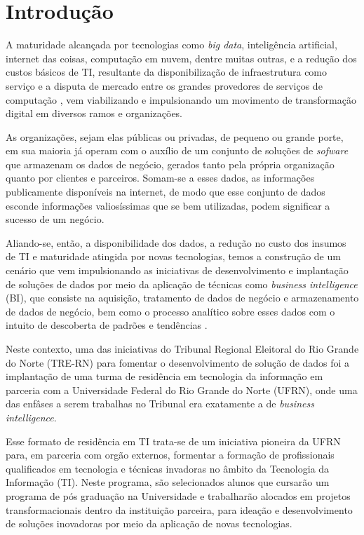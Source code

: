 
\section{Introdução}
A maturidade alcançada por tecnologias como \textit{big data}, inteligência artificial, internet das coisas, computação em nuvem, dentre muitas outras, e a redução dos custos básicos de TI, resultante da disponibilização de infraestrutura como serviço e a disputa de mercado entre os grandes provedores de serviços de computação \cite{infraPriceDrop}, vem viabilizando e impulsionando um movimento de transformação digital em diversos ramos e organizações.

As organizações, sejam elas públicas ou privadas, de pequeno ou grande porte, em sua maioria já operam com o auxílio de um conjunto de soluções de \textit{sofware} que armazenam os dados de negócio, gerados tanto pela própria organização quanto por clientes e parceiros. Somam-se a esses dados, as informações publicamente disponíveis na internet, de modo que esse conjunto de dados esconde informações valiosíssimas que se bem utilizadas, podem significar a sucesso de um negócio. 

Aliando-se, então, a disponibilidade dos dados, a redução no custo dos insumos de TI e maturidade atingida por novas tecnologias, temos a construção de um cenário que vem impulsionando as iniciativas de desenvolvimento e implantação de soluções de dados por meio da aplicação de técnicas como \textit{business intelligence} (BI), que consiste na aquisição, tratamento de dados de negócio e armazenamento de dados de negócio, bem como o processo analítico sobre esses dados com o intuito de descoberta de padrões e tendências \cite{BIDef}.

Neste contexto, uma das iniciativas do Tribunal Regional Eleitoral do Rio Grande do Norte (TRE-RN) para fomentar o desenvolvimento de solução de dados foi a implantação de uma turma de residência em tecnologia da informação em parceria com a Universidade Federal do Rio Grande do Norte (UFRN), onde uma das enfâses a serem trabalhas no Tribunal era exatamente a de \textit{business intelligence}. 

Esse formato de residência em TI trata-se de um iniciativa pioneira da UFRN para, em parceria com orgão externos, formentar a formação de profissionais qualificados em tecnologia e técnicas invadoras no âmbito da Tecnologia da Informação (TI). Neste programa, são selecionados alunos que cursarão um programa de pós graduação na Universidade e trabalharão alocados em projetos transformacionais dentro da instituição parceira, para ideação e desenvolvimento de soluções inovadoras por meio da aplicação de novas tecnologias.

